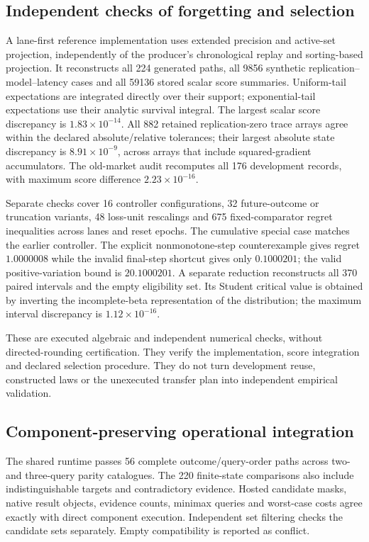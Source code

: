 \documentclass[11pt,a4paper]{article}
\theoremstyle{definition}\newtheorem{definition}[theorem]{Definition}
\begin{document}
\subsection{Independent checks of forgetting and selection}
A lane-first reference implementation uses extended precision and active-set projection, independently of the producer's chronological replay and sorting-based projection. It reconstructs all 224 generated paths, all 9856 synthetic replication--model--latency cases and all 59136 stored scalar score summaries. Uniform-tail expectations are integrated directly over their support; exponential-tail expectations use their analytic survival integral. The largest scalar score discrepancy is $1.83\times10^{-14}$. All 882 retained replication-zero trace arrays agree within the declared absolute/relative tolerances; their largest absolute state discrepancy is $8.91\times10^{-9}$, across arrays that include squared-gradient accumulators. The old-market audit recomputes all 176 development records, with maximum score difference $2.23\times10^{-16}$.

Separate checks cover 16 controller configurations, 32 future-outcome or truncation variants, 48 loss-unit rescalings and 675 fixed-comparator regret inequalities across lanes and reset epochs. The cumulative special case matches the earlier controller. The explicit nonmonotone-step counterexample gives regret $1.0000008$ while the invalid final-step shortcut gives only $0.1000201$; the valid positive-variation bound is $20.1000201$. A separate reduction reconstructs all 370 paired intervals and the empty eligibility set. Its Student critical value is obtained by inverting the incomplete-beta representation of the distribution; the maximum interval discrepancy is $1.12\times10^{-16}$.

These are executed algebraic and independent numerical checks, without directed-rounding certification. They verify the implementation, score integration and declared selection procedure. They do not turn development reuse, constructed laws or the unexecuted transfer plan into independent empirical validation.

\subsection{Component-preserving operational integration}\label{sec:runtimeresults}
The shared runtime passes 56 complete outcome/query-order paths across two- and three-query parity catalogues. The 220 finite-state comparisons also include indistinguishable targets and contradictory evidence. Hosted candidate masks, native result objects, evidence counts, minimax queries and worst-case costs agree exactly with direct component execution. Independent set filtering checks the candidate sets separately. Empty compatibility is reported as conflict.
\end{document}
